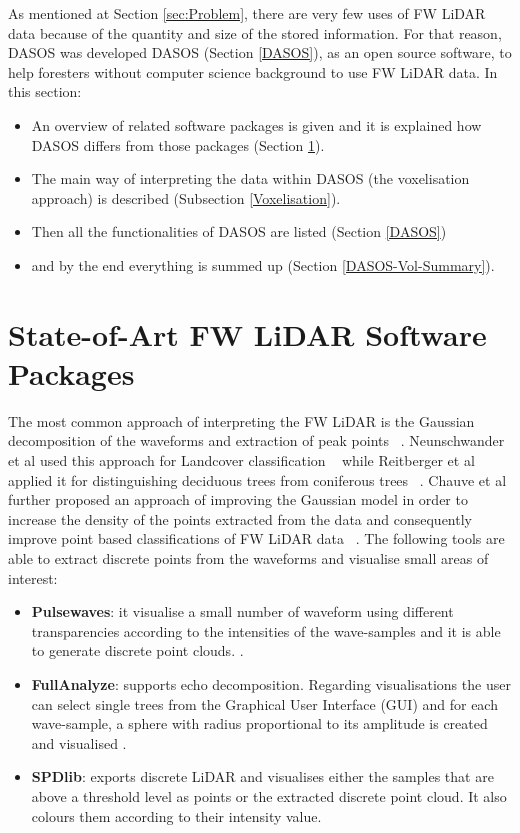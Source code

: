 \documentclass{subfiles}
\begin{document}
	
	\par As mentioned at Section \ref{sec:Problem}, there are very few uses of FW LiDAR data because of the quantity and size of the stored information. For that reason, DASOS was developed DASOS (Section \ref{DASOS}), as an open source software, to help foresters without computer science background to use FW LiDAR data. In this section:
	
	\begin{itemize}
		\item An overview of related software packages is given and it is explained how DASOS differs from those packages (Section \ref{LiDARsoftwares}).
		\item  The main way of interpreting the data within DASOS (the voxelisation approach) is described (Subsection \ref{Voxelisation}).
		\item Then all the functionalities of DASOS are listed (Section \ref{DASOS})
		\item and by the end everything is summed up (Section \ref{DASOS-Vol-Summary}).
	\end{itemize}
	
	
	\section{State-of-Art FW LiDAR Software Packages}\label{LiDARsoftwares}
	
	\par The most common approach of interpreting the FW LiDAR is the Gaussian decomposition of the waveforms and extraction of peak points ~\cite{Wanger2006}. Neunschwander et al used this approach for Landcover classification ~\cite{Neuenschwander2009} while Reitberger et al applied it for distinguishing deciduous trees from coniferous trees ~\cite{Reitberger2008}. Chauve et al further proposed an approach of improving the Gaussian model in order to increase the density of the points extracted from the data and consequently improve point based classifications of FW LiDAR data ~\cite{Chauve2007}.  The following tools are able to extract discrete points from the waveforms and visualise small areas of interest:
	 
	\begin{itemize}
		\item \textbf{Pulsewaves}: it visualise a small number of waveform using different transparencies according to the intensities of the wave-samples and it is able to generate discrete point clouds.  \cite{Isenburg2012Pulsewaves}.
	    \item \textbf{FullAnalyze}: supports echo decomposition. Regarding visualisations the user can select single trees from the Graphical User Interface (GUI) and for each wave-sample, a sphere with radius proportional to its amplitude is created and visualised \cite{Chauve2009}. 
    	\item \textbf{SPDlib}: exports discrete LiDAR and visualises either the samples that are above a threshold level as points or the extracted discrete point cloud. It also colours them according to their intensity value\cite{Bunting2013}. 
	\end{itemize}
\end{document}
